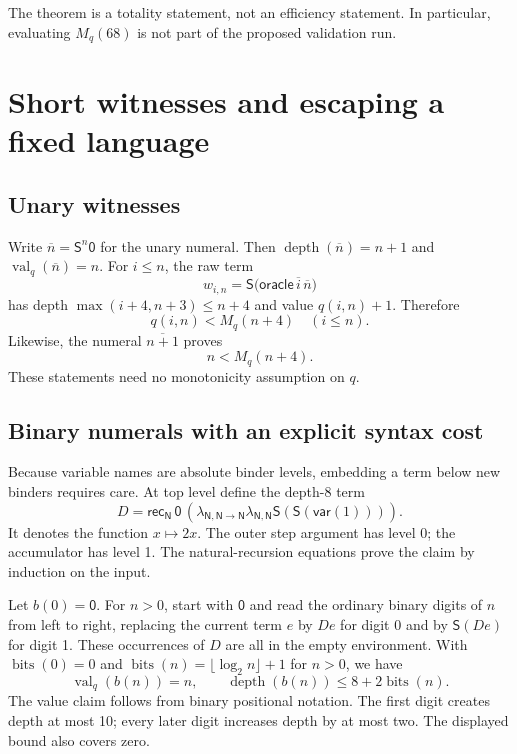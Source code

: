\documentclass[11pt]{article}
\theoremstyle{definition}
\newcommand{\tyN}{\mathsf N}
\newcommand{\val}{\operatorname{val}}
\newcommand{\depth}{\operatorname{depth}}
\newcommand{\bits}{\operatorname{bits}}
\newcommand{\Sc}{\mathsf S}
\newcommand{\Rc}{\mathsf{rec}}
\newcommand{\Oc}{\mathsf{oracle}}
\begin{document}
The theorem is a totality statement, not an efficiency statement. In
particular, evaluating $M_q(68)$ is not part of the proposed validation run.

\section{Short witnesses and escaping a fixed language}
\label{sec:diagonal}

\subsection{Unary witnesses}

Write $\overline n=\Sc^n\mathsf0$ for the unary numeral. Then
$\depth(\overline n)=n+1$ and $\val_q(\overline n)=n$.
For $i\le n$, the raw term
\begin{equation}\label{eq:unarywitness}
 w_{i,n}=\Sc\bigl(\Oc\,\overline i\,\overline n\bigr)
\end{equation}
has depth
$\max(i+4,n+3)\le n+4$ and value $q(i,n)+1$. Therefore
\begin{equation}\label{eq:oraclebasic}
 q(i,n)<M_q(n+4)\quad(i\le n).
\end{equation}
Likewise, the numeral $\overline{n+1}$ proves
\begin{equation}\label{eq:inputgrowth}
 n<M_q(n+4).
\end{equation}
These statements need no monotonicity assumption on $q$.

\subsection{Binary numerals with an explicit syntax cost}

Because variable names are absolute binder levels, embedding a term below
new binders requires care. At top level define the depth-8 term
\begin{equation}\label{eq:double}
 D=\Rc_{\tyN}\,\mathsf0\,
       (\lambda_{\tyN,\tyN\to\tyN}
         \lambda_{\tyN,\tyN}\Sc(\Sc(\mathsf{var}(1)))).
\end{equation}
It denotes the function $x\mapsto2x$. The outer step argument has level 0;
the accumulator has level 1. The natural-recursion equations prove the
claim by induction on the input.

Let $b(0)=\mathsf0$. For $n>0$, start with $\mathsf0$ and read the ordinary
binary digits of $n$ from left to right, replacing the current term $e$ by
$De$ for digit 0 and by $\Sc(De)$ for digit 1. These occurrences of $D$ are
all in the empty environment. With $\bits(0)=0$ and
$\bits(n)=\lfloor\log_2 n\rfloor+1$ for $n>0$, we have
\begin{equation}\label{eq:binary}
 \val_q(b(n))=n,\qquad \depth(b(n))\le8+2\bits(n).
\end{equation}
The value claim follows from binary positional notation. The first digit
creates depth at most 10; every later digit increases depth by at most two.
The displayed bound also covers zero.
\end{document}

